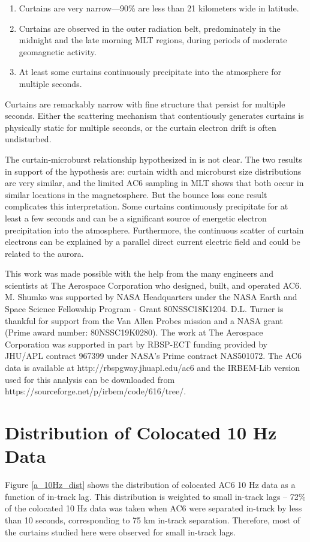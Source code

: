 \documentclass[draft]{agujournal2019}
\begin{document}
\begin{enumerate}
\item Curtains are very narrow---90\% are less than 21 kilometers wide in latitude.
\item Curtains are observed in the outer radiation belt, predominately in the midnight and the late morning MLT regions, during periods of moderate geomagnetic activity.
\item At least some curtains continuously precipitate into the atmosphere for multiple seconds.
\end{enumerate}

Curtains are remarkably narrow with fine structure that persist for multiple seconds. Either the scattering mechanism that contentiously generates curtains is physically static for multiple seconds, or the curtain electron drift is often undisturbed. 

The curtain-microburst relationship hypothesized in  is not clear. The two results in support of the hypothesis are: curtain width and microburst size distributions are very similar, and the limited AC6 sampling in MLT shows that both occur in similar locations in the magnetosphere. But the bounce loss cone result complicates this interpretation. Some curtains continuously precipitate for at least a few seconds and can be a significant source of energetic electron precipitation into the atmosphere. Furthermore, the continuous scatter of curtain electrons can be explained by a parallel direct current electric field and could be related to the aurora.


\acknowledgments
This work was made possible with the help from the many engineers and scientists at The Aerospace Corporation who designed, built, and operated AC6. M. Shumko was supported by NASA Headquarters under the NASA Earth and Space Science Fellowship Program - Grant 80NSSC18K1204. D.L. Turner is thankful for support from the Van Allen Probes mission and a NASA grant (Prime award number: 80NSSC19K0280). The work at The Aerospace Corporation was supported in part by RBSP-ECT funding provided by JHU/APL contract 967399 under NASA's Prime contract NAS501072. The AC6 data is available at http://rbspgway.jhuapl.edu/ac6 and the IRBEM-Lib version used for this analysis can be downloaded from https://sourceforge.net/p/irbem/code/616/tree/.

\appendix

\section{Distribution of Colocated 10 Hz Data}
Figure \ref{a_10Hz_dist} shows the distribution of colocated AC6 10 Hz data as a function of in-track lag. This distribution is weighted to small in-track lags -- 72\% of the colocated 10 Hz data was taken when AC6 were separated in-track by less than 10 seconds, corresponding to 75 km in-track separation. Therefore, most of the curtains studied here were observed for small in-track lags.
\end{document}
